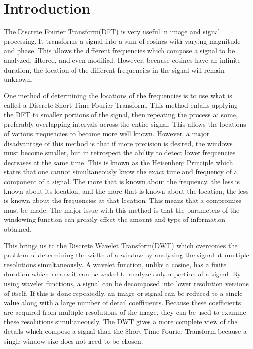 \section{Introduction}

The Discrete Fourier Transform(DFT) is very useful in image and signal processing.  It transforms a signal into a sum of cosines with varying magnitude and phase.  This allows the different frequencies which compose a signal to be analyzed, filtered, and even modified.  However, because cosines have an infinite duration, the location of the different frequencies in the signal will remain unknown.

One method of determining the locations of the frequencies is to use what is called a Discrete Short-Time Fourier Transform. This method entails applying the DFT to smaller portions of the signal, then repeating the process at some, preferably overlapping intervals across the entire signal.  This allows the locations of various frequencies to become more well known.  However, a major disadvantage of this method is that if more precision is desired, the windows must become smaller, but in retrospect the ability to detect lower frequencies decreases at the same time.  This is known as the Heisenberg Principle which states that one cannot simultaneously know the exact time and frequency of a component of a signal.  The more that is known about the frequency, the less is known about its location, and the more that is known about the location, the less is known about the frequencies at that location.  This means that a compromise must be made.  The major issue with this method is that the parameters of the windowing function can greatly effect the amount and type of information obtained.

This brings us to the Discrete Wavelet Transform(DWT) which overcomes the problem of determining the width of a window by analyzing the signal at multiple resolutions simultaneously.  A wavelet function, unlike a cosine, has a finite duration which means it can be scaled to analyze only a portion of a signal.  By using wavelet functions, a signal can be decomposed into lower resolution versions of itself.  If this is done repeatedly, an image or signal can be reduced to a single value along with a large number of detail coefficients.  Because these coefficients are acquired from multiple resolutions of the image, they can be used to examine these resolutions simultaneously.  The DWT gives a more complete view of the details which compose a signal than the Short-Time Fourier Transform because a single window size does not need to be chosen.

